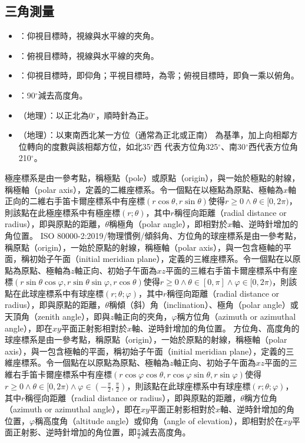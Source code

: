 \documentclass[a4paper,12pt]{report}
\begin{document}
\subsection{三角測量}
\begin{itemize}
\item {}：仰視目標時，視線與水平線的夾角。
\item {}：俯視目標時，視線與水平線的夾角。
\item {}：仰視目標時，即仰角；平視目標時，為零；俯視目標時，即負一乘以俯角。
\item {}：90$^{\circ}$減去高度角。
\item {}（地理）：以正北為0$^\circ$，順時針為正。
\item {}（地理）：以東南西北某一方位（通常為正北或正南） 為基準，加上向相鄰方位轉向的度數與該相鄰方位，如北35$^\circ$西 代表方位角325$^\circ$、南30$^\circ$西代表方位角210$^\circ$。
\end{itemize}
極座標系是由一參考點，稱極點（pole）或原點（origin），與一始於極點的射線，稱極軸（polar axis），定義的二維座標系。令一個點在以極點為原點、極軸為$x$軸正向的二維右手笛卡爾座標系中有座標$(r\cos\theta,r\sin\theta)$使得$r\geq 0\land\theta\in[0,2\pi)$，則該點在此極座標系中有極座標$(r;\theta)$，其中$r$稱徑向距離（radial distance or radius），即與原點的距離，$\theta$稱極角（polar angle），即相對於$x$軸、逆時針增加的角位置。
ISO 80000-2:2019/物理慣例/傾斜角、方位角的球座標系是由一參考點，稱原點（origin），一始於原點的射線，稱極軸（polar axis），與一包含極軸的平面，稱初始子午面（initial meridian plane），定義的三維座標系。令一個點在以原點為原點、極軸為$z$軸正向、初始子午面為$xz$平面的三維右手笛卡爾座標系中有座標$(r\sin\theta\cos\varphi,r\sin\theta\sin\varphi,r\cos\theta)$使得$r\geq 0\land\theta\in[0,\pi]\land\varphi\in[0,2\pi)$，則該點在此球座標系中有球座標$(r;\theta;\varphi)$，其中$r$稱徑向距離（radial distance or radius），即與原點的距離，$\theta$稱傾（斜）角（inclination）、極角（polar angle）或天頂角（zenith angle），即與$z$軸正向的夾角，$\varphi$稱方位角（azimuth or azimuthal angle），即在$xy$平面正射影相對於$x$軸、逆時針增加的角位置。
方位角、高度角的球座標系是由一參考點，稱原點（origin），一始於原點的射線，稱極軸（polar axis），與一包含極軸的平面，稱初始子午面（initial meridian plane），定義的三維座標系。令一個點在以原點為原點、極軸為$z$軸正向、初始子午面為$xz$平面的三維右手笛卡爾座標系中有座標$(r\cos\varphi\cos\theta,r\cos\varphi\sin\theta,r\sin\varphi)$使得$r\geq 0\land\theta\in[0,2\pi)\land\varphi\in(-\frac{\pi}{2},\frac{\pi}{2})$，則該點在此球座標系中有球座標$(r;\theta;\varphi)$，其中$r$稱徑向距離（radial distance or radius），即與原點的距離，$\theta$稱方位角（azimuth or azimuthal angle），即在$xy$平面正射影相對於$x$軸、逆時針增加的角位置，$\varphi$稱高度角（altitude angle）或仰角（angle of elevation），即相對於在$xy$平面正射影、逆時針增加的角位置，即$\frac{\pi}{2}$減去高度角。
\end{document}
